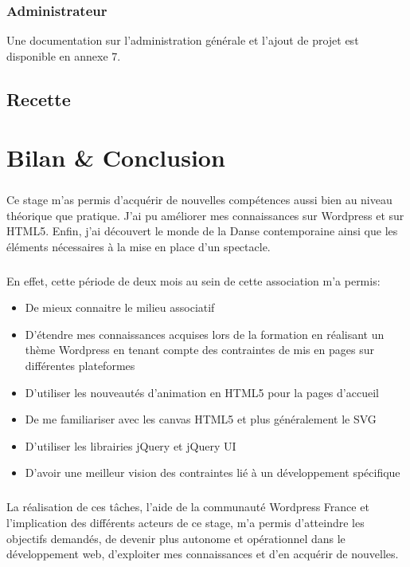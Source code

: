 \documentclass[11pt,a4paper]{report}
\begin{document}
		\subsection{Administrateur}Une documentation sur l'administration générale et l'ajout de projet est disponible en annexe 7.
	\section{Recette}

\chapter{Bilan \& Conclusion}
	\paragraph*{}Ce stage m'as permis d'acquérir de nouvelles compétences aussi bien au niveau théorique que pratique. J'ai pu améliorer mes connaissances sur Wordpress et sur HTML5. Enfin, j'ai découvert le monde de la Danse contemporaine ainsi que les éléments nécessaires à la mise en place d'un spectacle.
	\paragraph*{}En effet, cette période de deux mois au sein de cette association m'a permis:
	\begin{itemize}
		\item De mieux connaitre le milieu associatif
		\item D'étendre mes connaissances acquises lors de la formation en réalisant un thème Wordpress en tenant compte des contraintes de mis en pages sur différentes plateformes
		\item D'utiliser les nouveautés d'animation en HTML5 pour la pages d'accueil
		\item De me familiariser avec les canvas HTML5 et plus généralement le SVG
		\item D'utiliser les librairies jQuery et jQuery UI
		\item D'avoir une meilleur vision des contraintes lié à un développement spécifique
	\end{itemize}
	\paragraph*{}La réalisation de ces tâches, l'aide de la communauté Wordpress France et l'implication des différents acteurs de ce stage, m'a permis d'atteindre les objectifs demandés, de devenir plus autonome et opérationnel dans le développement web, d'exploiter mes connaissances et d'en acquérir de nouvelles.
\end{document}
